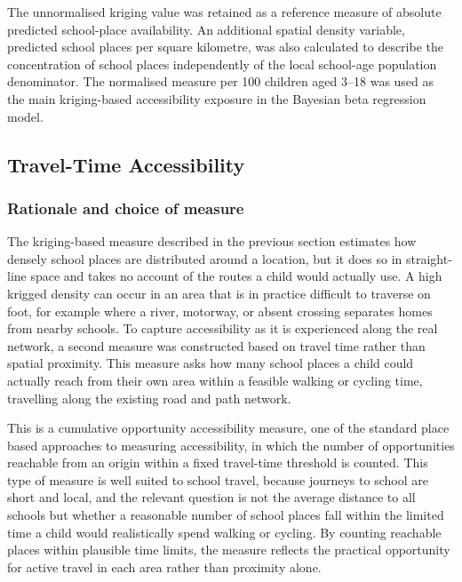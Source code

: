 \documentclass{article}
\begin{document}
The unnormalised kriging value was retained as a reference measure of
absolute predicted school-place availability. An additional spatial
density variable, predicted school places per square kilometre, was also
calculated to describe the concentration of school places independently
of the local school-age population denominator. The normalised measure
per 100 children aged 3--18 was used as the main kriging-based
accessibility exposure in the Bayesian beta regression model.

\subsection{Travel-Time Accessibility}\label{travel-time-accessibility}

\subsubsection{Rationale and choice of
measure}\label{rationale-and-choice-of-measure}

The kriging-based measure described in the previous section estimates
how densely school places are distributed around a location, but it does
so in straight-line space and takes no account of the routes a child
would actually use. A high krigged density can occur in an area that is
in practice difficult to traverse on foot, for example where a river,
motorway, or absent crossing separates homes from nearby schools. To
capture accessibility as it is experienced along the real network, a
second measure was constructed based on travel time rather than spatial
proximity. This measure asks how many school places a child could
actually reach from their own area within a feasible walking or cycling
time, travelling along the existing road and path network.

This is a cumulative opportunity accessibility measure, one of the
standard place based approaches to measuring accessibility, in which the
number of opportunities reachable from an origin within a fixed
travel-time threshold is counted. This type of measure is well suited to
school travel, because journeys to school are short and local, and the
relevant question is not the average distance to all schools but whether
a reasonable number of school places fall within the limited time a
child would realistically spend walking or cycling. By counting
reachable places within plausible time limits, the measure reflects the
practical opportunity for active travel in each area rather than
proximity alone.
\end{document}
